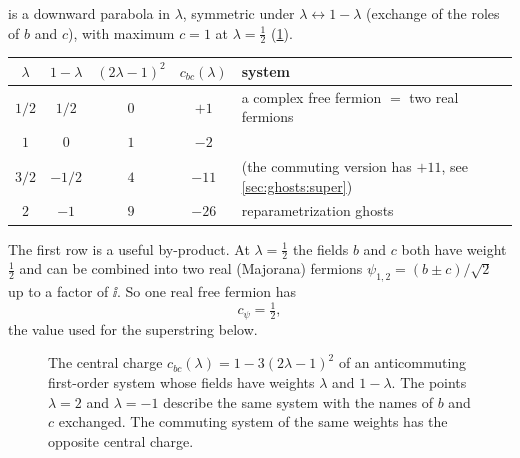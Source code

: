 \begin{example}\label{ex:ghosts:table}
 is a downward parabola in $\lambda$, symmetric under
$\lambda\leftrightarrow1-\lambda$ (exchange of the roles of $b$ and $c$), with maximum $c=1$
at $\lambda=\tfrac12$ (\cref{fig:ghosts:parabola}).
\begin{center}
\begin{tabular}{@{}ccccl@{}}
\toprule
$\lambda$ & $1-\lambda$ & $(2\lambda-1)^2$ & $c_{bc}(\lambda)$ & system\\
\midrule
$1/2$ & $1/2$ & $0$ & $+1$ & a complex free fermion $=$ two real fermions\\
$1$ & $0$ & $1$ & $-2$ & \\
$3/2$ & $-1/2$ & $4$ & $-11$ & (the commuting version has $+11$, see \cref{sec:ghosts:super})\\
$2$ & $-1$ & $9$ & $-26$ & reparametrization ghosts\\
\bottomrule
\end{tabular}
\end{center}
The first row is a useful by-product. At $\lambda=\tfrac12$ the fields $b$ and $c$ both have
weight $\tfrac12$ and can be combined into two real (Majorana) fermions
$\psi_{1,2}=(b\pm c)/\sqrt2$ up to a factor of $\ii$. So one real free fermion has
\[
  c_\psi=\tfrac12 ,
\]
the value used for the superstring below.
\end{example}

\begin{figure}[ht]
\centering
{}
\caption{The central charge $c_{bc}(\lambda)=1-3(2\lambda-1)^2$ of an anticommuting
first-order system whose fields have weights $\lambda$ and $1-\lambda$. The points
$\lambda=2$ and $\lambda=-1$ describe the same system with the names of $b$ and $c$
exchanged. The commuting system of the same weights has the opposite central charge.}
\label{fig:ghosts:parabola}
\end{figure}


